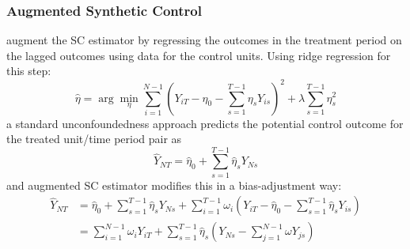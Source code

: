 \documentclass[twoside]{article}
\begin{document}
\subsubsection{Augmented Synthetic Control}
\citet{ben2021augmented} augment the SC estimator by regressing the outcomes in the treatment period on the lagged outcomes using data for the control units. Using ridge regression for this step:
\begin{equation*}
    \hat{\eta} = \arg\min_{\eta} \sum^{N-1}_{i=1} \left( Y_{iT} - \eta_0 - \sum^{T-1}_{s=1}\eta_sY_{is} \right)^2 + \lambda \sum^{T-1}_{s=1}\eta^2_s
\end{equation*}
a standard unconfoundedness approach predicts the potential control outcome for the treated unit/time period pair as $$ \hat{Y}_{NT} = \hat{\eta}_0 + \sum^{T-1}_{s=1}\hat{\eta}_s Y_{Ns} $$
and augmented SC estimator modifies this in a bias-adjustment way:
\begin{align*}
    \hat{Y}_{NT} &= \hat{\eta}_0 + \sum^{T-1}_{s=1}\hat{\eta}_s Y_{Ns} + \sum^{T-1}_{i=1}\omega_i \left(Y_{iT}-\hat{\eta}_0 - \sum^{T-1}_{s=1}\hat{\eta}_s Y_{is}\right) \\
    & = \sum^{N-1}_{i=1}\omega_i Y_{iT} + \sum^{T-1}_{s=1}\hat{\eta}_s \left(Y_{Ns}-\sum^{N-1}_{j=1}\omega Y_{js}\right)
\end{align*}
\end{document}
